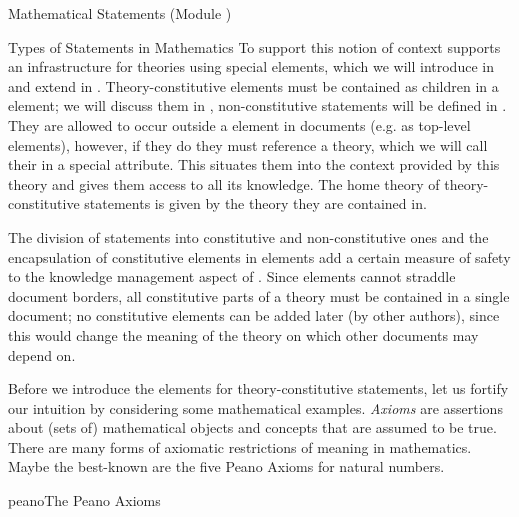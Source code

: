 \begin{tchapter}[id=statements,short=Mathematical Statements]{Mathematical Statements (Module {})}
\begin{tsection}[id=statements-constitutive]{Types of Statements in Mathematics}
  To support this notion of context {\omdoc} supports an infrastructure for theories using
  special {} elements, which we will introduce in
  {} and extend in {}.
  Theory-constitutive elements must be contained as children in a {} element;
  we will discuss them in {}, non-constitutive statements will be
  defined in {}. They are allowed to occur outside a
  {} element in {\omdoc} documents (e.g. as top-level elements), however,
  if they do they must reference a theory, which we will call their
  {} in a special {} attribute. This
  situates them into the context provided by this theory and gives them access to all its
  knowledge. The home theory of theory-constitutive statements is given by the theory they
  are contained in.
  
  The division of statements into constitutive and non-constitutive ones and the
  encapsulation of constitutive elements in {} elements add a certain
  measure of safety to the knowledge management aspect of {\omdoc}.  Since {\xml} elements
  cannot straddle document borders, all constitutive parts of a theory must be contained
  in a single document; no constitutive elements can be added later (by other authors),
  since this would change the meaning of the theory on which other documents may depend
  on.
  
  Before we introduce the {\omdoc} elements for theory-constitutive statements, let us
  fortify our intuition by considering some mathematical examples.  {\emph{Axioms}} are
  assertions about (sets of) mathematical objects and concepts that are assumed to be
  true. There are many forms of axiomatic restrictions of meaning in mathematics. Maybe
  the best-known are the five Peano Axioms for natural numbers.

\begin{myfig}{peano}{The Peano Axioms}
\end{myfig}


\end{tsection}
\end{tchapter}
